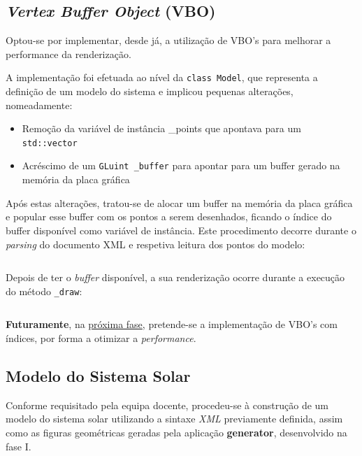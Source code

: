 \documentclass[runningheads]{llncs}
\newenvironment{code}{\captionsetup{type=listing}}{}
\begin{document}
\subsection{\textit{Vertex Buffer Object} (VBO)}
Optou-se por implementar, desde já, a utilização de VBO's
para melhorar a performance da renderização.

A implementação foi efetuada ao nível da \texttt{class Model},
que representa a definição de um modelo do sistema e
implicou pequenas alterações, nomeadamente:
\begin{itemize}
    \item Remoção da variável de instância \_points que apontava para um \texttt{std::vector}
    \item Acréscimo de um \texttt{GLuint _buffer} para apontar para um buffer gerado na memória da placa gráfica
\end{itemize}

Após estas alterações, tratou-se de alocar um buffer na memória 
da placa gráfica e popular esse buffer com os pontos a serem desenhados,
ficando o índice do buffer disponível como variável de instância.
Este procedimento decorre durante o \textit{parsing} do 
documento XML e respetiva leitura dos pontos do modelo:

\begin{code}
\label{code:vbo_gen}
\inputminted[firstline=46, lastline=48]{cpp}{../../Model.cpp}
\end{code}

Depois de ter o \textit{buffer} disponível, a sua renderização
ocorre durante a execução do método \texttt{_draw}:
\begin{code}
\label{code:render_vbo}
\inputminted[firstline=73, lastline=75]{cpp}{../../Model.cpp}
\end{code}

\textbf{Futuramente}, na \underline{próxima fase}, pretende-se a implementação
de VBO's com índices, por forma a otimizar a \textit{performance}.

\subsection{Modelo do Sistema Solar} \label{sec:modelo_ss}
Conforme requisitado pela equipa docente, procedeu-se
à construção de um modelo do sistema solar utilizando a
sintaxe \textit{XML} previamente definida, assim como
as figuras geométricas geradas pela aplicação \textbf{generator}, desenvolvido na fase I.
\end{document}
